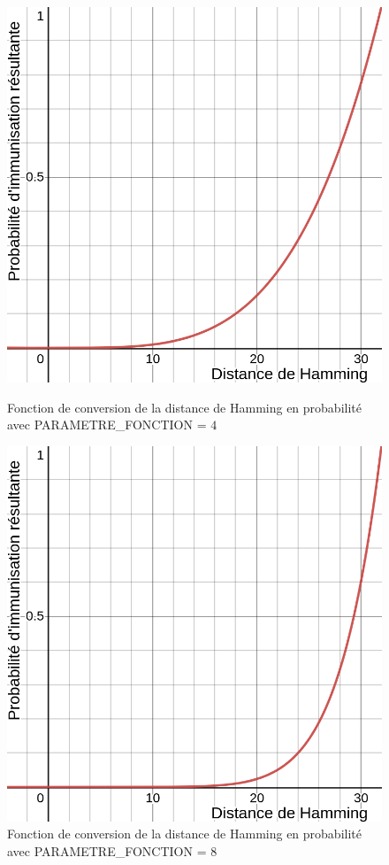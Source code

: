 \begin{figure}[h]
  \centering
    \captionsetup{justification=centering}
  \begin{minipage}[b]{0.4\textwidth}
    \includegraphics[width=\textwidth]{Images/fonction_4.png}
    \caption[Fonction de converstion en probabilité (facteur 4)]{Fonction de conversion de la distance de Hamming en probabilité avec {\small PARAMETRE\_FONCTION} = $4$}
  \end{minipage}
  \hfill
  \begin{minipage}[b]{0.4\textwidth}
    \includegraphics[width=\textwidth]{Images/fonction_8.png}
    \caption[Fonction de converstion en probabilité (facteur 8)]{Fonction de conversion de la distance de Hamming en probabilité avec {\small PARAMETRE\_FONCTION} = $8$}
  \end{minipage}
\end{figure}


